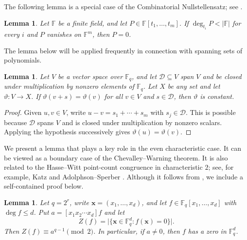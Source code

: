 \documentclass[12pt,reqno]{amsart}
\newtheorem{lem}[thm]{Lemma}
\theoremstyle{definition}
\newcommand{\F}{\mathbb{F}}
\newcommand{\cD}{\mathcal D}
\begin{document}
The following lemma is a special case of the Combinatorial Nullstellensatz; see \cite{Alon99}.

\begin{lem}\label{lem:grid}
Let $\mathbb{F}$ be a finite field, and let $P\in \mathbb{F}[t_1,\ldots,t_m]$. If
$\deg_{t_i}P<|\mathbb{F}|$ for every $i$ and $P$ vanishes on $\mathbb{F}^m$, then $P=0$.
\end{lem}

The lemma below will be applied frequently in connection with spanning sets of polynomials.

\begin{lem}\label{lem:spanning-invariance}
Let $V$ be a vector space over $\F_q$, and let $\cD\subseteq V$ span $V$ and be closed under multiplication by nonzero elements of $\F_q$. Let $X$ be any set and let $\vartheta\colon V\to X$. If $\vartheta(v+s)=\vartheta(v)$ for all $v\in V$ and $s\in\cD$, then $\vartheta$ is constant.
\end{lem}

\begin{proof}
Given $u,v\in V$, write $u-v=s_1+\cdots+s_m$ with $s_j\in\cD$. This is possible because $\cD$ spans $V$ and is closed under multiplication by nonzero scalars. Applying the hypothesis successively gives $\vartheta(u)=\vartheta(v)$.
\end{proof}

We present a lemma that plays a key role in the even characteristic case. It can be viewed as a boundary case of the Chevalley--Warning theorem. It is also related to the Hasse--Witt point-count congruence in characteristic $2$; see, for example, Katz \cite[Section 2.3.7]{Kat72} and Adolphson--Sperber \cite{AS17}. Although it follows from \cite[Theorem 1.4]{AS17}, we include a self-contained proof below.

\begin{lem}\label{lem:parity}
Let $q=2^r$, write $\mathbf x=(x_1,\ldots,x_d)$, and let $f\in \F_q[x_1,\ldots,x_d]$ with $\deg f\leq d$. Put $a=[x_1x_2\cdots x_d]f$ and let
\[
  Z(f)=\bigl|\{\mathbf x\in \F_q^d:f(\mathbf x)=0\}\bigr|.
\]
Then $Z(f)\equiv a^{q-1}\pmod2$. In particular, if $a\neq0$, then $f$ has a zero in $\F_q^d$.
\end{lem}
\end{document}
